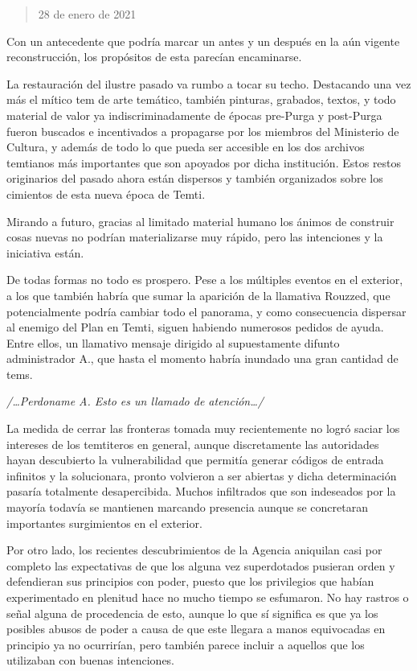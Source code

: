 \documentclass[
]{book}
\begin{document}
\begin{quote}
28 de enero de 2021
\end{quote}

Con un antecedente que podría marcar un antes y un después en la aún vigente reconstrucción, los propósitos de esta parecían encaminarse.

La restauración del ilustre pasado va rumbo a tocar su techo. Destacando una vez más el mítico tem de arte temático, también pinturas, grabados, textos, y todo material de valor ya indiscriminadamente de épocas pre-Purga y post-Purga fueron buscados e incentivados a propagarse por los miembros del Ministerio de Cultura, y además de todo lo que pueda ser accesible en los dos archivos temtianos más importantes que son apoyados por dicha institución. Estos restos originarios del pasado ahora están dispersos y también organizados sobre los cimientos de esta nueva época de Temti.

Mirando a futuro, gracias al limitado material humano los ánimos de construir cosas nuevas no podrían materializarse muy rápido, pero las intenciones y la iniciativa están.

De todas formas no todo es prospero. Pese a los múltiples eventos en el exterior, a los que también habría que sumar la aparición de la llamativa Rouzzed, que potencialmente podría cambiar todo el panorama, y como consecuencia dispersar al enemigo del Plan en Temti, siguen habiendo numerosos pedidos de ayuda. Entre ellos, un llamativo mensaje dirigido al supuestamente difunto administrador A., que hasta el momento habría inundado una gran cantidad de tems.

\emph{/\ldots Perdoname A. Esto es un llamado de atención\ldots/}

La medida de cerrar las fronteras tomada muy recientemente no logró saciar los intereses de los temtiteros en general, aunque discretamente las autoridades hayan descubierto la vulnerabilidad que permitía generar códigos de entrada infinitos y la solucionara, pronto volvieron a ser abiertas y dicha determinación pasaría totalmente desapercibida. Muchos infiltrados que son indeseados por la mayoría todavía se mantienen marcando presencia aunque se concretaran importantes surgimientos en el exterior.

Por otro lado, los recientes descubrimientos de la Agencia aniquilan casi por completo las expectativas de que los alguna vez superdotados pusieran orden y defendieran sus principios con poder, puesto que los privilegios que habían experimentado en plenitud hace no mucho tiempo se esfumaron. No hay rastros o señal alguna de procedencia de esto, aunque lo que sí significa es que ya los posibles abusos de poder a causa de que este llegara a manos equivocadas en principio ya no ocurrirían, pero también parece incluir a aquellos que los utilizaban con buenas intenciones.
\end{document}
